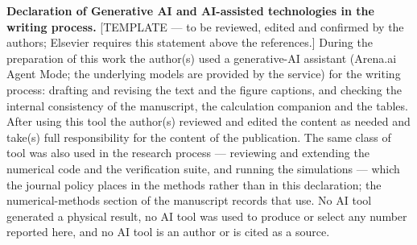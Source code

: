 \documentclass[preprint,12pt]{elsarticle}
\begin{document}
\textbf{Declaration of Generative AI and AI-assisted technologies in the writing process.} [TEMPLATE --- to be reviewed, edited and confirmed by the authors; Elsevier requires this statement above the references.] During the preparation of this work the author(s) used a generative-AI assistant (Arena.ai Agent Mode; the underlying models are provided by the service) for the writing process: drafting and revising the text and the figure captions, and checking the internal consistency of the manuscript, the calculation companion and the tables. After using this tool the author(s) reviewed and edited the content as needed and take(s) full responsibility for the content of the publication. The same class of tool was also used in the research process --- reviewing and extending the numerical code and the verification suite, and running the simulations --- which the journal policy places in the methods rather than in this declaration; the numerical-methods section of the manuscript records that use. No AI tool generated a physical result, no AI tool was used to produce or select any number reported here, and no AI tool is an author or is cited as a source.


\end{document}

